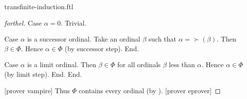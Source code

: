 \documentclass{naproche-library}
\begin{document}
\begin{smodule}{transfinite-induction.ftl}
\begin{proof}[forthel]
      Case $\alpha = 0$. Trivial.

      Case $\alpha$ is a successor ordinal.
        Take an ordinal $\beta$ such that $\alpha = \succ(\beta)$.
        Then $\beta \in \Phi$.
        Hence $\alpha \in \Phi$ (by successor step).
      End.

      Case $\alpha$ is a limit ordinal.
        Then $\beta \in \Phi$ for all ordinals $\beta$ less than $\alpha$.
        Hence $\alpha \in \Phi$ (by limit step).
      End.
    End.

    [prover vampire]
    Thus $\Phi$ contains every ordinal (by ).
    [prover eprover]
  \end{proof}
\end{smodule}
\end{document}
